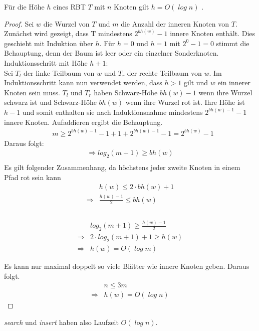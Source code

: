 \documentclass[a4paper,12pt]{article}
\begin{document}
\begin{Lemma} Für die Höhe $h$ eines RBT $T$ mit $n$ Knoten gilt $h = \mathit{O(\log {n})}$ . 
\end{Lemma}
\begin{proof}
	Sei $w$ die Wurzel von $T$ und $m$ die Anzahl der inneren Knoten von $T$. 
	Zunächst wird gezeigt, dass T mindestens $2^\mathit{bh(w)} - 1$ innere Knoten enthält.
	Dies geschieht mit Induktion über $h$. Für $h = 0$ und  $h = 1$ mit $2^0 - 1 = 0 $ stimmt die Behauptung, denn der Baum ist leer oder ein einzelner Sonderknoten.  
	Induktionsschritt mit Höhe $h + 1$:\\
	Sei $T_l$ der linke Teilbaum von $w$ und $T_r$ der rechte Teilbaum von $w$.  
	Im Induktionsschritt kann nun verwendet werden, dass $h > 1$ gilt und $w$ ein innerer Knoten sein muss. $T_l$ und $T_r$ haben Schwarz-Höhe $\mathit{bh(w)} - 1$ wenn ihre Wurzel schwarz ist und Schwarz-Höhe $\mathit{bh(w)}$ wenn ihre Wurzel rot ist. Ihre Höhe ist $h-1$ und somit enthalten sie nach Induktionsnahme mindestens  $2^\mathit{bh(w)- 1} - 1$ innere Knoten. Aufaddieren ergibt die Behauptung.\\    
	\begin{align*}
	&m \geq 2^\mathit{bh(w)- 1} - 1  + 1  + 2^\mathit{bh(w)- 1} - 1 = 2^\mathit{bh(w)} - 1
	\end{align*}
	Daraus folgt:\\
	\begin{align*}
	\Rightarrow  log_2(m + 1) \geq\mathit{bh(w)}\\ 
	\end{align*}
	\noindent Es gilt folgender Zusammenhang, da höchstens jeder zweite Knoten in einem Pfad rot sein kann\\
	\begin{align*}
	&\mathit{h(w)} \leq 2 \cdot \mathit{bh(w) } + 1 \\
	\Rightarrow &\frac{\mathit{h(w)} - 1}{2} \leq\mathit{bh(w) } \\
	\end{align*}
	\\
	\begin{align*}
	&log_2(m + 1) \geq\frac{\mathit{h(w)} - 1}{2} \\
	\Rightarrow	&2 \cdot log_2(m + 1) + 1 \geq\mathit{h(w)} \\
	\Rightarrow &\mathit{h(w)} = \mathit{O(\log {m})} 
	\end{align*}
	
	
	
	
	
	
	\noindent Es kann nur maximal doppelt so viele Blätter wie innere Knoten geben. Daraus folgt.
	\begin{align*}
	&n  \leq 3 m \\
	\Rightarrow &\mathit{h(w)} = \mathit{O(\log {n})} 
	\end{align*} 
	
	
\end{proof}
\noindent \textit{search} und \textit{insert} haben also Laufzeit $\mathit{O(\log {n})}$.
\end{document}
